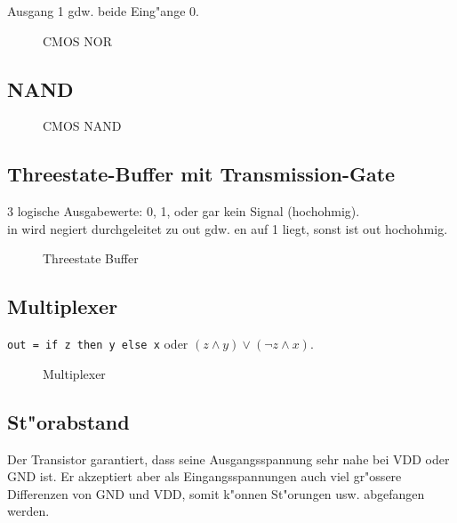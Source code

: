 \documentclass[german, 10pt, a4paper, twocolumn]{scrartcl}
\theoremstyle{definition}
\begin{document}
Ausgang 1 gdw. beide Eing"ange 0.

\begin{figure}[hbt]
 
 \centerline{\box\graph}
 \caption{CMOS NOR}
 \label{cmos_nor}
\end{figure}

\subsection{NAND}

\begin{figure}[hbt]
 
 \centerline{\box\graph}
 \caption{CMOS NAND}
 \label{cmos_nand}
\end{figure}

\pagebreak
\subsection{Threestate-Buffer mit Transmission-Gate}

3 logische Ausgabewerte: 0, 1, oder gar kein Signal (hochohmig).\\
in wird negiert durchgeleitet zu out gdw. en auf 1 liegt, sonst ist out hochohmig.

\begin{figure}[hbt]
 
 \centerline{\box\graph}
 \caption{Threestate Buffer}
 \label{cmos_threestate}
\end{figure}


\subsection{Multiplexer}

\verb#out = if z then y else x# oder $(z \land y) \lor (\lnot z \land x)$.

\begin{figure}[hbt]
 
 \centerline{\box\graph}
 \caption{Multiplexer}
 \label{cmos_multiplexer}
\end{figure}

\subsection{St"orabstand}

Der Transistor garantiert, dass seine Ausgangsspannung sehr nahe bei VDD oder GND ist. Er akzeptiert aber als Eingangsspannungen auch viel gr"ossere Differenzen von GND und VDD, somit k"onnen St"orungen usw. abgefangen werden.
\end{document}
